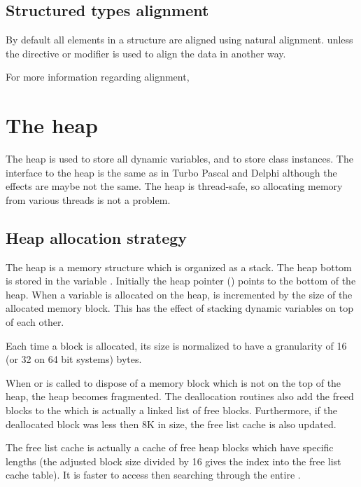 \subsection{Structured types alignment}
\label{se:StructuredAlignment}

By default all elements in a structure are aligned using natural alignment.
unless the  directive or  modifier is used
to align the data in another way. 

For more information regarding alignment, 

\section{The heap}
\label{se:Heap}
The heap is used to store all dynamic variables, and to store class
instances. The interface to the heap is the same as in Turbo Pascal 
and Delphi although the effects are maybe not the same. 
The heap is thread-safe, so allocating memory from various 
threads is not a problem.
\subsection{Heap allocation strategy}

The heap is a memory structure which is organized as a stack. The heap
bottom is stored in the variable . Initially the heap
pointer () points to the bottom of the heap. When a
variable is allocated on the heap,  is incremented by the
size of the allocated memory block. This has the effect of stacking
dynamic variables on top of each other.

Each time a block is allocated, its size is normalized to have
a granularity of 16 (or 32 on 64 bit systems) bytes.

When  or  is called to dispose of a
memory block which is not on the top of the heap, the heap becomes
fragmented. The deallocation routines also add the freed blocks to
the  which is actually a linked list of free blocks.
Furthermore, if the deallocated block was less then 8K in size, the
free list cache is also updated.

The free list cache is actually a cache of free heap blocks which
have specific lengths (the adjusted block size divided by 16 gives the
index into the free list cache table). It is faster to access then
searching through the entire .

